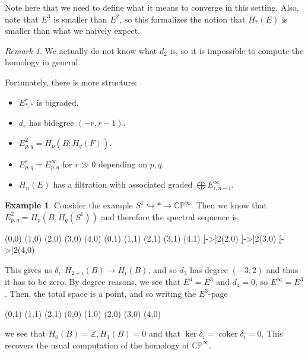 \documentclass[leqno, openany]{memoir}
\theoremstyle{definition}
\newtheorem{exm}[thm]{Example}
\theoremstyle{remark}
\newtheorem{rmk}[thm]{Remark}
\theoremstyle{plain}
\theoremstyle{definition}
\theoremstyle{remark}
\newcommand{\C}{\mathbb{C}}
\newcommand{\Z}{\mathbb{Z}}
\renewcommand{\P}{\mathbb{P}}
\DeclareMathOperator{\coker}{coker}
\begin{document}
Note here that we need to define what it means to converge in this setting. Also, note that $E^3$ is smaller than $E^2$, so this formalizes the notion that $H_*(E)$ is smaller than what we naively expect.

\begin{rmk}
    We actually do not know what $d_2$ is, so it is impossible to compute the homology in general.
\end{rmk}

Fortunately, there is more structure:
\begin{itemize}
    \item $E^r_{*,*}$ is bigraded.
    \item $d_r$ has bidegree $(-r, r-1)$.
    \item $E_{p,q}^2 = H_p(B; H_q(F))$.
    \item $E_{p,q}^r = E_{p,q}^{\infty}$ for $r \gg 0$ depending on $p,q$.
    \item $H_n(E)$ has a filtration with associated graded $\bigoplus E_{i, n-i}^{\infty}$.
\end{itemize}

\begin{exm}
    Consider the example $S^1 \hookrightarrow * \to \C\P^{\infty}$. Then we know that $E_{p,q}^2 = H_p(B, H_q(S^1))$ and therefore the spectral sequence is
    \begin{center}
    \begin{sseqdata}[classes={draw=none},name=cpinf,homological Serre grading,xscale=1.8, y axis gap = 2em]
        \class["H_0(B)"](0,0)
        \class["H_1(B)"](1,0)
        \class["H_2(B)"](2,0)
        \class["H_3(B)"](3,0)
        \class["\ldots"](4,0)
        \class["H_0(B)"](0,1)
        \class["H_1(B)"](1,1)
        \class["H_2(B)"](2,1)
        \class["H_3(B)"](3,1)
        \class["\ldots"](4,1)
        \d[->]2(2,0)
        \d[->]2(3,0)
        \d[->]2(4,0)
    \end{sseqdata}
    \printpage[name=cpinf,page=2, grid=chess]
    \end{center}
    This gives us $\delta_i \colon H_{2+i}(B) \to H_i(B)$, and so $d_3$ has degree $(-3, 2)$ and thus it has to be zero. By degree reasons, we see that $E^4 = E^3$ and $d_4 = 0$, so $E^{\infty} = E^3$. Then, the total space is a point, and so writing the $E^3$-page
    \begin{center}
        \begin{sseqdata}[classes={draw=none},name=cpinf3,homological Serre grading,xscale=1.8, y axis gap = 2em]
            \class["\coker \delta_0"](0,1)
            \class["\coker \delta_1"](1,1)
            \class["\coker \delta_2"](2,1)
            \class["H_0(B)"](0,0)
            \class["H_1(B)"](1,0)
            (2,0)
            (3,0)
            (4,0)
        \end{sseqdata}
        \printpage[name=cpinf3, page=3, grid=chess]
    \end{center}
    we see that $H_0(B) = \Z, H_1(B) = 0$ and that $\ker \delta_i = \operatorname{coker} \delta_i = 0$. This recovers the usual computation of the homology of $\C\P^{\infty}$.
\end{exm}
\end{document}
